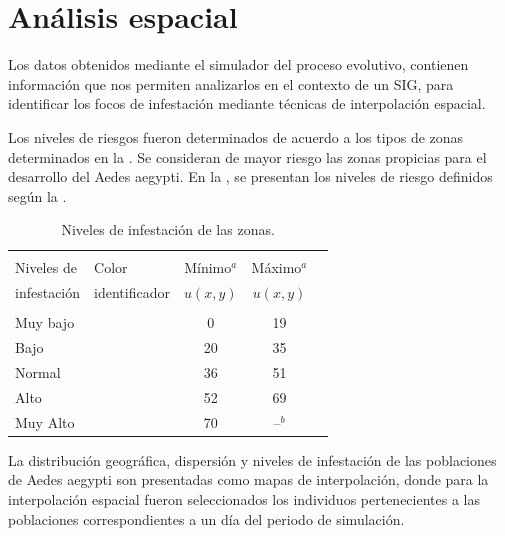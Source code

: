 \section {Análisis espacial}

Los datos obtenidos mediante el simulador del proceso evolutivo, contienen información que nos
permiten analizarlos en el contexto de un SIG, para identificar los focos de infestación mediante
técnicas de interpolación espacial.

Los niveles de riesgos fueron determinados de acuerdo a los tipos de zonas determinados en la
. Se consideran de mayor riesgo las zonas propicias para el
desarrollo del Aedes aegypti. En la , se presentan los niveles de
riesgo definidos según la .


\begin{table}[!hptb]
    \begin{minipage}{\textwidth}
\begin{center}
    \caption{\label{tab:niveles-riesgo-zonas} Niveles de infestación de las zonas.}
    \begin{tabular}{p{3cm} l c c c}
        \hline \\
         Niveles de  & Color & Mínimo$^a$ & Máximo$^a$ \\
         infestación & identificador & $u(x,y)$   & $u(x,y)$  \\
        \hline
        \hline\\
        Muy bajo  & \cellcolor{muybajo}& 0  & 19 \\
        Bajo    & \cellcolor{bajo}& 20 & 35 \\
        Normal & \cellcolor{normal}& 36 & 51 \\
        Alto   & \cellcolor{alto}& 52 & 69 \\
        Muy Alto & \cellcolor{muyalto} & 70 & --$^b$\\
    \end{tabular}
\end{center}
    \end{minipage}
\end{table}

La distribución geográfica, dispersión y niveles de infestación de las poblaciones de Aedes aegypti
son presentadas como mapas de interpolación, donde para la interpolación espacial fueron
seleccionados los individuos pertenecientes a las poblaciones correspondientes a un día del
periodo de simulación.

